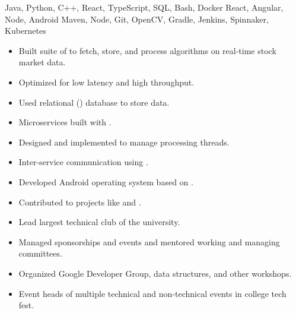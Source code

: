  Java, Python, C++, React, TypeScript, SQL, Bash, Docker\newline
{} React, Angular, Node, Android\newline
{} Maven, Node, Git, OpenCV, Gradle, Jenkins, Spinnaker, Kubernetes\newline


\begin{itemize}
  \item Built  suite of  to fetch, store, and process algorithms on real-time stock market data.
  \item Optimized for low latency and high throughput.
  \item Used relational () database to store data.
  \item Microservices built with .
  \item Designed and implemented  to manage processing threads.
  \item Inter-service communication using .
 \end{itemize}

\begin{itemize}
  \item Developed Android operating system based on .
  \item Contributed to  projects like  and .
 \end{itemize}


\begin{itemize}
    \item Lead largest technical club of the university.
    \item Managed sponsorships and events and mentored working and managing committees.
    \item Organized Google Developer Group, data structures, and other workshops.
 \end{itemize}
\begin{itemize}
    \item Event heads of multiple technical and non-technical events in college tech fest.
 \end{itemize}

